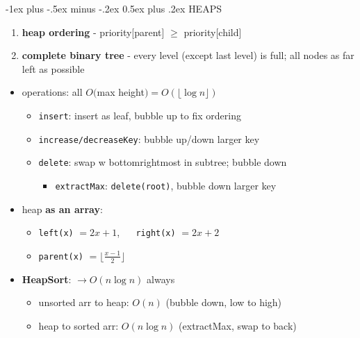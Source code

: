 \documentclass[10pt, landscape]{article}
\makeatletter
\renewcommand{\section}{\@startsection{section}{1}{0mm}%
                                {-1ex plus -.5ex minus -.2ex}%
                                {0.5ex plus .2ex}%
                                {\normalfont\large\bfseries}}
\newcommand{\floor}[1]{\lfloor #1 \rfloor}
\let\then\rightarrow
\newcommand{\code}[1]{\textcolor{mygreen}{\texttt{#1}}}
\makeatother
\begin{document}
\begin{multicols}{4}
\section{HEAPS}
\begin{enumerate}
    \item \textbf{heap ordering} - priority[parent] $\geq$ priority[child]
    \item \textbf{complete binary tree} - every level (except last level) is full; all nodes as far left as possible
\end{enumerate}
\begin{itemize}
    \item operations: all $O($max height$) = O(\floor{\log n})$
    \begin{itemize}
        \item \code{insert}: insert as leaf, bubble up to fix ordering
        \item \code{increase/decreaseKey}: bubble up/down larger key
        \item \code{delete}: swap w bottomrightmost in subtree; bubble down
        \begin{itemize}
            \item \code{extractMax}: \code{delete(root)}, bubble down larger key
        \end{itemize} 
    \end{itemize}
    \item heap \textbf{as an array}:
    \begin{itemize}
        \item \code{left(x)} $= 2x + 1$, $\quad$ \code{right(x)} $= 2x + 2$
        \item \code{parent(x)} $= \floor{\frac{x-1}{2}}$
    \end{itemize}
    \item \textbf{HeapSort}: $\then O(n \log n)$ always
    \begin{itemize}
        \item unsorted arr to heap: $O(n)$ (bubble down, low to high)
        \item heap to sorted arr: $O(n \log n)$ (extractMax, swap to back)
    \end{itemize}
\end{itemize}


\end{multicols}
\end{document}
